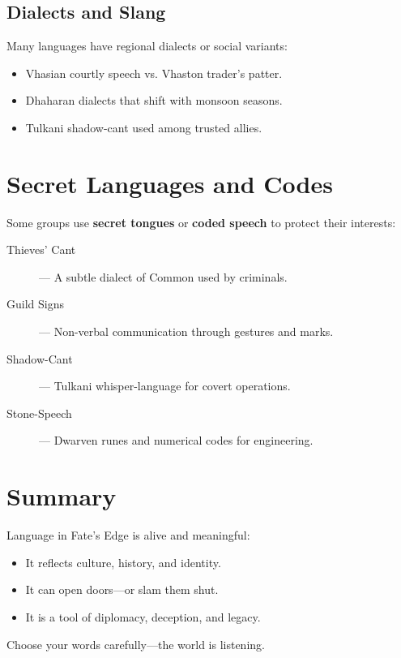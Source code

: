 \subsection*{Dialects and Slang}

Many languages have regional dialects or social variants:

\begin{itemize}
  \item Vhasian courtly speech vs. Vhaston trader's patter.
  \item Dhaharan dialects that shift with monsoon seasons.
  \item Tulkani shadow-cant used among trusted allies.
\end{itemize}

\section{Secret Languages and Codes}

Some groups use \textbf{secret tongues} or \textbf{coded speech} to protect their interests:

\begin{description}
  \item[Thieves' Cant] — A subtle dialect of Common used by criminals.
  \item[Guild Signs] — Non-verbal communication through gestures and marks.
  \item[Shadow-Cant] — Tulkani whisper-language for covert operations.
  \item[Stone-Speech] — Dwarven runes and numerical codes for engineering.
\end{description}

\section{Summary}

Language in Fate’s Edge is alive and meaningful:

\begin{itemize}
  \item It reflects culture, history, and identity.
  \item It can open doors—or slam them shut.
  \item It is a tool of diplomacy, deception, and legacy.
\end{itemize}

Choose your words carefully—the world is listening.


